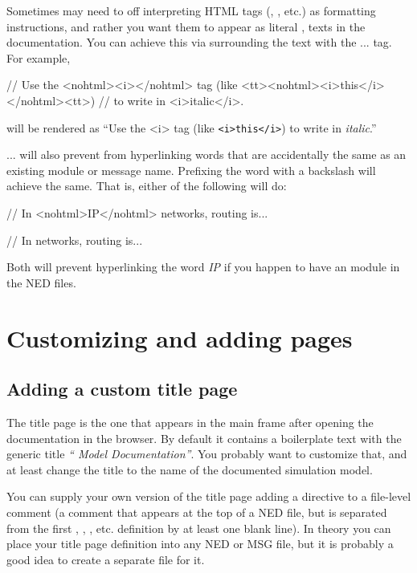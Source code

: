 Sometimes may need to off interpreting HTML tags (, , etc.)
as formatting instructions, and rather you want them to appear as literal
,  texts in the documentation. You can achieve this via
surrounding the text with the ... tag.
For example,

\begin{ned}
// Use the <nohtml><i></nohtml> tag (like <tt><nohtml><i>this</i></nohtml><tt>)
// to write in <i>italic</i>.
\end{ned}

will be rendered as ``Use the <i> tag (like \texttt{<i>this</i>}) to write
in \textit{italic}.''

... will also prevent 
from hyperlinking words that are accidentally the same as an existing
module or message name. Prefixing the word with a backslash will achieve
the same. That is, either of the following will do:

\begin{ned}
// In <nohtml>IP</nohtml> networks, routing is...
\end{ned}

\begin{ned}
// In \IP networks, routing is...
\end{ned}

Both will prevent hyperlinking the word \textit{IP} if you happen to have
an  module in the NED files.



\section{Customizing and adding pages}

\subsection{Adding a custom title page}

The title page is the one that appears in the main frame after
opening the documentation in the browser. By default it contains
a boilerplate text with the generic title \textit{``{\opp} Model Documentation''}.
You probably want to customize that, and at least change the title
to the name of the documented simulation model.

You can supply your own version of the title page adding a 
directive to a file-level comment (a comment that appears at the top of
a NED file, but is separated from the first , ,
, etc. definition by at least one blank line).
In theory you can place your title page definition into
any NED or MSG file, but it is probably a good idea to create
a separate  file for it.

